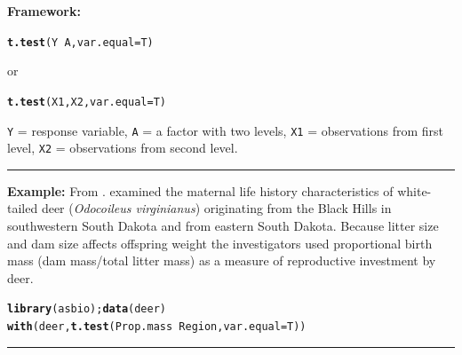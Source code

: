 \documentclass[12pt,english]{article}\usepackage[]{graphicx}\usepackage[table]{xcolor}
\makeatletter
\newcommand{\hlopt}[1]{\textcolor[rgb]{0,0,0}{#1}}%
\newcommand{\hldef}[1]{\textcolor[rgb]{0.345,0.345,0.345}{#1}}%
\newcommand{\hlkwc}[1]{\textcolor[rgb]{0.333,0.667,0.333}{#1}}%
\newcommand{\hlkwd}[1]{\textcolor[rgb]{0.737,0.353,0.396}{\textbf{#1}}}%
\newenvironment{kframe}{%
 \def\at@end@of@kframe{}%
 \ifinner\ifhmode%
  \def\at@end@of@kframe{\end{minipage}}%
  \begin{minipage}{\columnwidth}%
 \fi\fi%
 \def\FrameCommand##1{\hskip\@totalleftmargin \hskip-\fboxsep
 \colorbox{shadecolor}{##1}\hskip-\fboxsep
     \hskip-\linewidth \hskip-\@totalleftmargin \hskip\columnwidth}%
 \MakeFramed {\advance\hsize-\width
   \@totalleftmargin\z@ \linewidth\hsize
   \@setminipage}}%
 {\par\unskip\endMakeFramed%
 \at@end@of@kframe}
\newenvironment{knitrout}{}{} %
\makeatother
\begin{document}
\begin{tcolorbox}[colback=yellow!50!red!25!white,colbacktitle=yellow!50!red,colframe=black!75!white,title=\textbf{R:} Pooled Variance $t$-Test]


\textbf{Framework:}\\
\vspace{-.2in}
\begin{knitrout}
\color{fgcolor}\begin{kframe}
\begin{alltt}
\hlkwd{t.test}\hldef{(Y} \hlopt{~} \hldef{A,} \hlkwc{var.equal} \hldef{= T)}
\end{alltt}
\end{kframe}
\end{knitrout}
\vspace{-.1in}
or
\vspace{-.1in}
\begin{knitrout}
\color{fgcolor}\begin{kframe}
\begin{alltt}
\hlkwd{t.test}\hldef{(X1, X2,} \hlkwc{var.equal} \hldef{= T)}
\end{alltt}
\end{kframe}
\end{knitrout}
\texttt{Y} = response variable, \texttt{A} = a factor with two levels, \texttt{X1} = observations from first level, \texttt{X2} = observations from second level.
\vspace{0.1in}
\par\noindent\rule{.9\textwidth}{0.4pt}

\textbf{Example:} From \citep[][pp 215-217]{aho2014}.  \citet{monteith2009} examined the maternal life history characteristics of white-tailed deer (\textit{Odocoileus virginianus}) originating from the Black Hills in southwestern South Dakota and from eastern South Dakota. Because litter size and dam size affects offspring weight the investigators used proportional birth mass (dam mass/total litter mass) as a measure of reproductive investment by deer.
\vspace{-.1in}
\begin{knitrout}
\color{fgcolor}\begin{kframe}
\begin{alltt}
\hlkwd{library}\hldef{(asbio);} \hlkwd{data}\hldef{(deer)}
\hlkwd{with}\hldef{(deer,} \hlkwd{t.test}\hldef{(Prop.mass} \hlopt{~} \hldef{Region,} \hlkwc{var.equal} \hldef{= T))}
\end{alltt}
\end{kframe}
\end{knitrout}
\end{tcolorbox}
\par\noindent\rule{.9\textwidth}{0.4pt}
\end{document}
